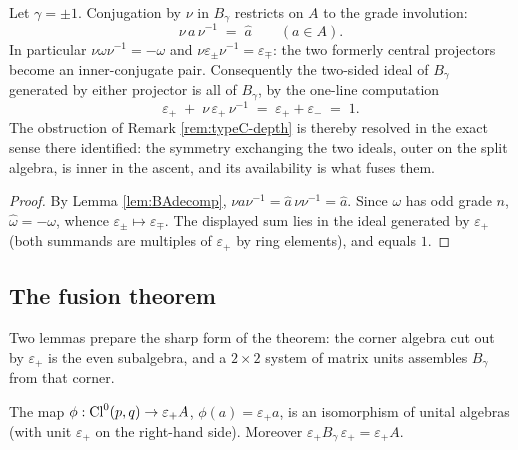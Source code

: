 \begin{proposition}\label{prop:innergrade}
Let $\gamma = \pm 1$. Conjugation by $\nu$ in $B_\gamma$ restricts on $A$ to the grade involution:
\[
\nu\, a\, \nu^{-1} \;=\; \hat{a} \qquad (a \in A).
\]
In particular $\nu \omega \nu^{-1} = -\omega$ and $\nu \varepsilon_\pm \nu^{-1} = \varepsilon_\mp$: the two formerly central projectors become an inner-conjugate pair. Consequently the two-sided ideal of $B_\gamma$ generated by either projector is all of $B_\gamma$, by the one-line computation
\[
\varepsilon_+ \;+\; \nu\,\varepsilon_+\,\nu^{-1} \;=\; \varepsilon_+ + \varepsilon_- \;=\; 1 .
\]
The obstruction of Remark \ref{rem:typeC-depth} is thereby resolved in the exact sense there identified: the symmetry exchanging the two ideals, outer on the split algebra, is inner in the ascent, and its availability is what fuses them.
\end{proposition}

\begin{proof}
By Lemma \ref{lem:BAdecomp}, $\nu a \nu^{-1} = \hat{a}\,\nu\nu^{-1} = \hat{a}$. Since $\omega$ has odd grade $n$, $\hat{\omega} = -\omega$, whence $\varepsilon_\pm \mapsto \varepsilon_\mp$. The displayed sum lies in the ideal generated by $\varepsilon_+$ (both summands are multiples of $\varepsilon_+$ by ring elements), and equals $1$.
\end{proof}

\subsection{The fusion theorem}\label{subsec:fusion}

Two lemmas prepare the sharp form of the theorem: the corner algebra cut out by $\varepsilon_+$ is the even subalgebra, and a $2 \times 2$ system of matrix units assembles $B_\gamma$ from that corner.

\begin{lemma}\label{lem:corner}
The map $\phi : \mathrm{Cl}^0(p,q) \to \varepsilon_+ A$, $\phi(a) = \varepsilon_+ a$, is an isomorphism of unital algebras (with unit $\varepsilon_+$ on the right-hand side). Moreover $\varepsilon_+ B_\gamma\, \varepsilon_+ = \varepsilon_+ A$.
\end{lemma}

